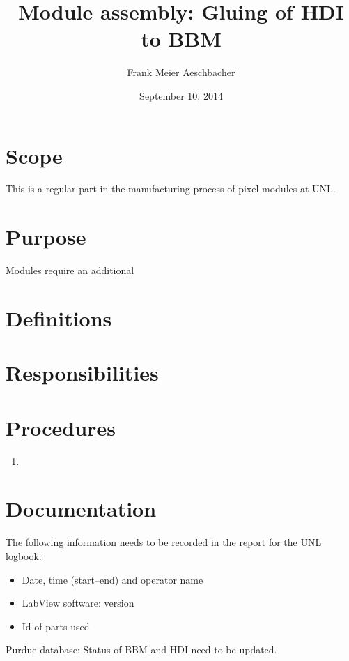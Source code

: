 \documentclass[12pt]{unlsilabsop}
\title{Module assembly: Gluing of HDI to BBM}
\date{September 10, 2014}
\author{Frank Meier Aeschbacher}
\begin{document}
\maketitle

\section{Scope}
This is a regular part in the manufacturing process of pixel modules at UNL.

\section{Purpose}
Modules require an additional

\section{Definitions}

\section{Responsibilities}

\section{Procedures}

\begin{enumerate}
\item 
\end{enumerate}

\section{Documentation}
The following information needs to be recorded in the report for the UNL logbook:
\begin{itemize}
\item Date, time (start--end) and operator name
\item LabView software: version
\item Id of parts used
\end{itemize}

Purdue database: Status of BBM and HDI need to be updated.
\end{document}
